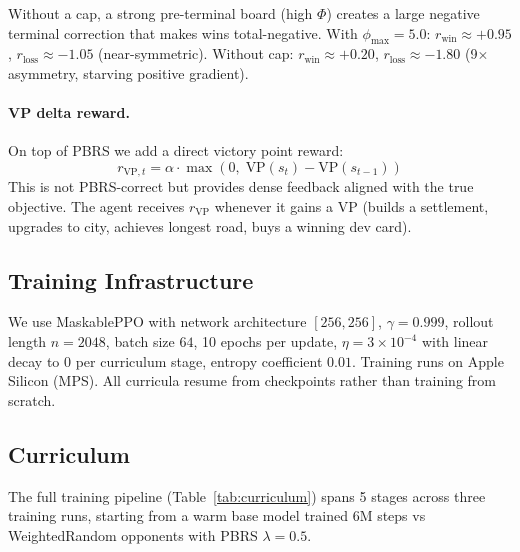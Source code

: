 \documentclass[10pt,twocolumn]{article}
\begin{document}
Without a cap, a strong pre-terminal board (high $\Phi$) creates a large
negative terminal correction that makes wins total-negative. With
$\phi_{\max}{=}5.0$: $r_{\text{win}} \approx +0.95$, $r_{\text{loss}} \approx -1.05$
(near-symmetric). Without cap: $r_{\text{win}} \approx +0.20$, $r_{\text{loss}} \approx -1.80$
(9$\times$ asymmetry, starving positive gradient).

\paragraph{VP delta reward.}
On top of PBRS we add a direct victory point reward:
\begin{equation}
  r_{\text{VP},t} = \alpha \cdot \max(0,\; \text{VP}(s_t) - \text{VP}(s_{t-1}))
  \label{eq:vp}
\end{equation}
This is not PBRS-correct but provides dense feedback aligned with the true
objective. The agent receives $r_{\text{VP}}$ whenever it gains a VP (builds
a settlement, upgrades to city, achieves longest road, buys a winning dev card).

\subsection{Training Infrastructure}

We use MaskablePPO with network architecture $[256, 256]$, $\gamma{=}0.999$,
rollout length $n{=}2048$, batch size $64$, 10 epochs per update, $\eta{=}3 \times 10^{-4}$
with linear decay to 0 per curriculum stage, entropy coefficient $0.01$.
Training runs on Apple Silicon (MPS). All curricula resume from checkpoints
rather than training from scratch.

\subsection{Curriculum}

The full training pipeline (Table~\ref{tab:curriculum}) spans 5 stages
across three training runs, starting from a warm base model trained 6M steps
vs WeightedRandom opponents with PBRS $\lambda{=}0.5$.
\end{document}
